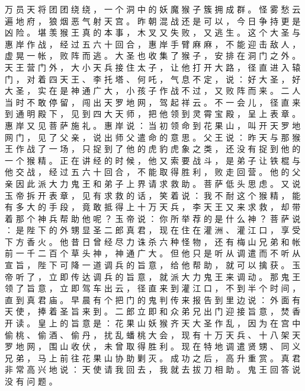 {万 员 天 将 团 团 绕 绕 ， 一 个 洞 中 的 妖 魔 猴 子 簇 拥 成 群 。
怪 雾 愁 云 遍 地 府 ， 狼 烟 恶 气 射 天 宫 。
昨 朝 混 战 还 是 可 以 ， 今 日 争 持 更 是 凶 险 。
堪 羡 猴 王 真 的 本 事 ， 木 叉 又 失 败 ， 又 逃 生 。
这 个 大 圣 与 惠 岸 作 战 ， 经 过 五 六 十 回 合 ， 惠 岸 手 臂 麻 麻 ， 不 能 迎 击 敌 人 ， 虚 晃 一 帐 ， 败 阵 而 逃 。
大 圣 也 收 集 了 猴 子 ， 安 排 在 洞 门 之 外 。
天 王 营 门 外 ， 大 小 天 兵 接 住 太 子 ， 让 他 打 开 大 路 ， 径 直 进 入 辕 门 ， 对 着 四 天 王 、 李 托 塔 、 何 吒 ， 气 息 不 定 ， 说 ： 好 大 圣 ， 好 大 圣 ， 实 在 是 神 通 广 大 ， 小 孩 子 作 战 不 过 ， 又 败 阵 而 来 。
二 人 当 时 不 敢 停 留 ， 闯 出 天 罗 地 网 ， 驾 起 祥 云 。
不 一 会 儿 ， 径 直 来 到 通 明 殿 下 ， 见 到 四 大 天 师 ， 把 他 领 到 灵 霄 宝 殿 ， 呈 上 表 章 。
惠 岸 又 见 菩 萨 施 礼 。
惠 岸 说 ： 当 初 领 命 到 花 果 山 ， 叫 开 天 罗 地 网 门 ， 见 了 父 亲 ， 说 出 师 父 遣 命 的 意 思 。
父 王 说 ： 昨 天 与 那 猴 王 作 战 了 一 场 ， 只 捉 到 了 他 的 虎 豹 虎 象 之 类 ， 还 没 有 捉 到 他 的 一 个 猴 精 。
正 在 讲 经 的 时 候 ， 他 又 索 要 战 斗 ， 是 弟 子 让 铁 棍 与 他 交 战 ， 经 过 五 六 十 回 合 ， 不 能 取 得 胜 利 ， 败 走 回 营 。
他 的 父 亲 因 此 派 大 力 鬼 王 和 弟 子 上 界 请 求 救 助 。
菩 萨 低 头 思 虑 。
又 说 玉 帝 拆 开 表 章 ， 见 有 求 救 的 话 ， 笑 着 说 ： 我 不 耐 这 个 猴 精 ， 能 有 多 大 的 手 段 ， 竟 敢 抵 得 上 十 万 天 兵 ， 李 天 王 又 来 求 救 ， 却 带 着 那 个 神 兵 帮 助 他 呢 ？
玉 帝 说 ： 你 所 举 荐 的 是 什 么 神 ？ 菩 萨 说 ： 是 陛 下 的 外 甥 显 圣 二 郎 真 君 ， 现 在 住 在 灌 洲 、 灌 江 口 ， 享 受 下 方 香 火 。
他 昔 日 曾 经 尽 力 诛 杀 六 种 怪 物 ， 还 有 梅 山 兄 弟 和 帐 前 一 千 二 百 个 草 头 神 ， 神 通 广 大 。
但 他 只 是 听 从 调 遣 而 不 听 从 宣 旨 ， 陛 下 可 降 一 道 调 兵 的 旨 意 ， 给 他 帮 助 ， 就 可 以 擒 获 。
玉 帝 听 了 ， 立 即 传 达 调 兵 的 旨 意 ， 就 派 大 力 鬼 王 来 调 动 。
那 鬼 王 领 了 旨 意 ， 立 即 驾 车 出 云 ， 径 直 来 到 灌 江 口 ， 不 到 半 个 时 间 ， 直 到 真 君 庙 。
早 晨 有 个 把 门 的 鬼 判 传 来 报 告 到 里 边 说 ： 外 面 有 天 使 ， 捧 着 圣 旨 来 到 。
二 郎 立 即 和 众 弟 兄 出 门 迎 接 旨 意 ， 焚 香 开 读 。
皇 上 的 旨 意 是 ： 花 果 山 妖 猴 齐 天 大 圣 作 乱 ， 因 为 在 宫 中 偷 桃 、 偷 酒 、 偷 丹 ， 扰 乱 蟠 桃 大 会 ， 现 有 十 万 天 兵 、 十 八 架 天 罗 地 网 ， 围 山 收 伏 ， 未 曾 取 得 胜 利 。
现 在 特 地 调 遣 贤 甥 、 同 义 兄 弟 ， 马 上 前 往 花 果 山 协 助 剿 灭 。
成 功 之 后 ， 高 升 重 赏 。
真 君 非 常 高 兴 地 说 ： 天 使 请 我 回 去 ， 我 就 去 拔 刀 相 助 。
鬼 王 回 答 说 没 有 问 题 。
}
